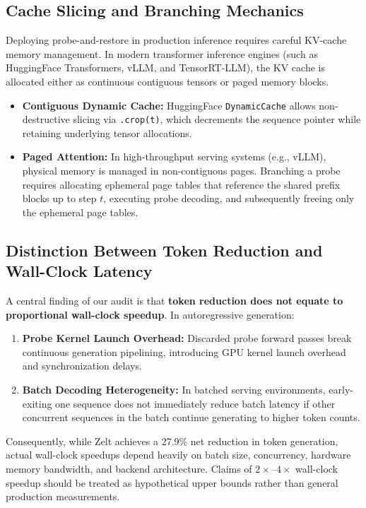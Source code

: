 \documentclass[11pt]{article}
\begin{document}
\subsection{Cache Slicing and Branching Mechanics}
Deploying probe-and-restore in production inference requires careful KV-cache memory management. In modern transformer inference engines (such as HuggingFace Transformers, vLLM, and TensorRT-LLM), the KV cache is allocated either as continuous contiguous tensors or paged memory blocks.
\begin{itemize}
  \item \textbf{Contiguous Dynamic Cache:} HuggingFace \texttt{DynamicCache} allows non-destructive slicing via \texttt{.crop(t)}, which decrements the sequence pointer while retaining underlying tensor allocations.
  \item \textbf{Paged Attention:} In high-throughput serving systems (e.g., vLLM), physical memory is managed in non-contiguous pages. Branching a probe requires allocating ephemeral page tables that reference the shared prefix blocks up to step $t$, executing probe decoding, and subsequently freeing only the ephemeral page tables.
\end{itemize}

\subsection{Distinction Between Token Reduction and Wall-Clock Latency}
A central finding of our audit is that \textbf{token reduction does not equate to proportional wall-clock speedup}. In autoregressive generation:
\begin{enumerate}
  \item \textbf{Probe Kernel Launch Overhead:} Discarded probe forward passes break continuous generation pipelining, introducing GPU kernel launch overhead and synchronization delays.
  \item \textbf{Batch Decoding Heterogeneity:} In batched serving environments, early-exiting one sequence does not immediately reduce batch latency if other concurrent sequences in the batch continue generating to higher token counts.
\end{enumerate}
Consequently, while Zelt achieves a 27.9\% net reduction in token generation, actual wall-clock speedups depend heavily on batch size, concurrency, hardware memory bandwidth, and backend architecture. Claims of $2\times$--$4\times$ wall-clock speedup should be treated as hypothetical upper bounds rather than general production measurements.
\end{document}
